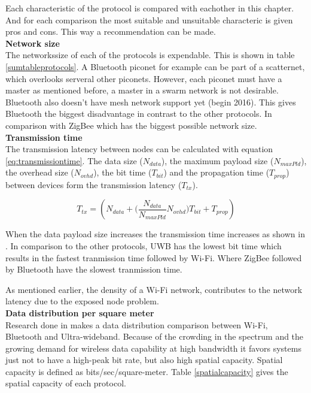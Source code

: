 \documentclass[10pt,a4paper]{article}
\begin{document}
Each characteristic of the protocol is compared with eachother in this chapter. And for each comparison the most suitable and unsuitable characteric is given pros and cons. This way a recommendation can be made.\\

\textbf{\large Network size}\\
The networkssize of each of the protocols is expendable. This is shown in table \ref{sumtableprotocols}. A Bluetooth piconet for example can be part of a scatternet, which overlooks serveral other piconets. However, each piconet must have a master as mentioned before, a master in a swarm network is not desirable. Bluetooth also doesn't have mesh network support yet (begin 2016). \cite{bluetoothmesh} This gives Bluetooth the biggest disadvantage in contrast to the other protocols. In comparison with ZigBee which has the biggest possible network size.\\


\textbf{\large Transmission time}\\
The transmission latency between nodes can be calculated with equation \ref{eq:transmissiontime}.\cite{comparitivestudywirelessprotocols} The data size ($N_{data}$), the maximum payload size ($N_{maxPld}$), the overhead size ($N_{ovhd}$), the bit time ($T_{bit}$) and the propagation time ($T_{prop}$) between devices form the transmission latency ($T_{tx}$). 

\begin{equation}
    T_{tx}=(N_{data} + \Bigg(\frac{N_{data}}{N_{maxPld}} N_{ovhd} \Bigg) T_{bit} + T_{prop})
    \label{eq:transmissiontime}
\end{equation}

When the data payload size increases the transmission time increases as shown in \cite{comparitivestudywirelessprotocols}. In comparison to the other protocols, UWB has the lowest bit time which results in the fastest tranmission time followed by Wi-Fi. Where ZigBee followed by Bluetooth have the slowest tranmission time.

As mentioned earlier, the density of a Wi-Fi network, contributes to the network latency due to the exposed node problem.\cite{combook} \\

\textbf{Data distribution per square meter}\\
Research done in \cite{ultrawidebandshortmediumrange} makes a data distribution comparison between Wi-Fi, Bluetooth and Ultra-wideband. Because of the crowding in the spectrum and the growing demand for wireless data capability at high bandwidth it favors systems just not to have a high-peak bit rate, but also high spatial capacity. Spatial capacity is defined as bits/sec/square-meter. \cite{ultrawidebandshortmediumrange} Table \ref{spatialcapacity} gives the spatial capacity of each protocol.
\end{document}
